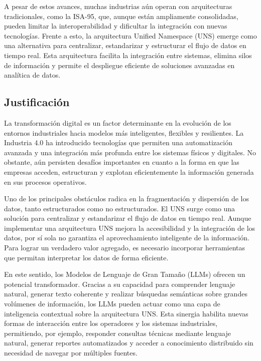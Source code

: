A pesar de estos avances, muchas industrias aún operan con arquitecturas tradicionales, como la ISA-95, que, aunque están ampliamente consolidadas, pueden limitar la interoperabilidad y dificultar la integración con nuevas tecnologías. Frente a esto, la arquitectura Unified Namespace (UNS) emerge como una alternativa para centralizar, estandarizar y estructurar el flujo de datos en tiempo real. Esta arquitectura facilita la integración entre sistemas, elimina silos de información y permite el despliegue eficiente de soluciones avanzadas en analítica de datos.


\subsection*{\centering Justificación}

La transformación digital es un factor determinante en la evolución de los entornos industriales hacia modelos más inteligentes, flexibles y resilientes. La Industria 4.0 ha introducido tecnologías que permiten una automatización avanzada y una integración más profunda entre los sistemas físicos y digitales. No obstante, aún persisten desafíos importantes en cuanto a la forma en que las empresas acceden, estructuran y explotan eficientemente la información generada en sus procesos operativos.


Uno de los principales obstáculos radica en la fragmentación y dispersión de los datos, tanto estructurados como no estructurados. El UNS surge como una solución para centralizar y estandarizar el flujo de datos en tiempo real. Aunque implementar una arquitectura UNS mejora la accesibilidad y la integración de los datos, por sí sola no garantiza el aprovechamiento inteligente de la información. Para lograr un verdadero valor agregado, es necesario incorporar herramientas que permitan interpretar los datos de forma eficiente.


En este sentido, los Modelos de Lenguaje de Gran Tamaño (LLMs) ofrecen un potencial transformador. Gracias a su capacidad para comprender lenguaje natural, generar texto coherente y realizar búsquedas semánticas sobre grandes volúmenes de información, los LLMs pueden actuar como una capa de inteligencia contextual sobre la arquitectura UNS. Esta sinergia habilita nuevas formas de interacción entre los operadores y los sistemas industriales, permitiendo, por ejemplo, responder consultas técnicas mediante lenguaje natural, generar reportes automatizados y acceder a conocimiento distribuido sin necesidad de navegar por múltiples fuentes.



